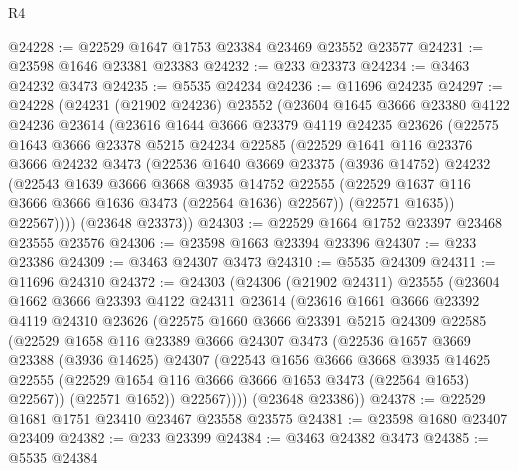 \begin{lexlean}{R4}
\begin{coremodule}
@24228 := @22529 @1647 @1753 @23384 @23469 @23552 @23577
@24231 := @23598 @1646 @23381 @23383
@24232 := @233 @23373
@24234 := @3463 @24232 @3473
@24235 := @5535 @24234
@24236 := @11696 @24235
@24297 := @24228
    (@24231
      (@21902 @24236)
      @23552
      (@23604
        @1645
        @3666
        @23380
        @4122
        @24236
        @23614
        (@23616
          @1644
          @3666
          @23379
          @4119
          @24235
          @23626
          (@22575
            @1643
            @3666
            @23378
            @5215
            @24234
            @22585
            (@22529
              @1641
              @116
              @23376
              @3666
              @24232
              @3473
              (@22536
                @1640
                @3669
                @23375
                (@3936 @14752)
                @24232
                (@22543
                  @1639
                  @3666
                  @3668
                  @3935
                  @14752
                  @22555
                  (@22529 @1637 @116 @3666 @3666 @1636 @3473 (@22564 @1636) @22567))
                (@22571 @1635))
              @22567))))
      (@23648 @23373))
@24303 := @22529 @1664 @1752 @23397 @23468 @23555 @23576
@24306 := @23598 @1663 @23394 @23396
@24307 := @233 @23386
@24309 := @3463 @24307 @3473
@24310 := @5535 @24309
@24311 := @11696 @24310
@24372 := @24303
    (@24306
      (@21902 @24311)
      @23555
      (@23604
        @1662
        @3666
        @23393
        @4122
        @24311
        @23614
        (@23616
          @1661
          @3666
          @23392
          @4119
          @24310
          @23626
          (@22575
            @1660
            @3666
            @23391
            @5215
            @24309
            @22585
            (@22529
              @1658
              @116
              @23389
              @3666
              @24307
              @3473
              (@22536
                @1657
                @3669
                @23388
                (@3936 @14625)
                @24307
                (@22543
                  @1656
                  @3666
                  @3668
                  @3935
                  @14625
                  @22555
                  (@22529 @1654 @116 @3666 @3666 @1653 @3473 (@22564 @1653) @22567))
                (@22571 @1652))
              @22567))))
      (@23648 @23386))
@24378 := @22529 @1681 @1751 @23410 @23467 @23558 @23575
@24381 := @23598 @1680 @23407 @23409
@24382 := @233 @23399
@24384 := @3463 @24382 @3473
@24385 := @5535 @24384

\end{coremodule}
\end{lexlean}
